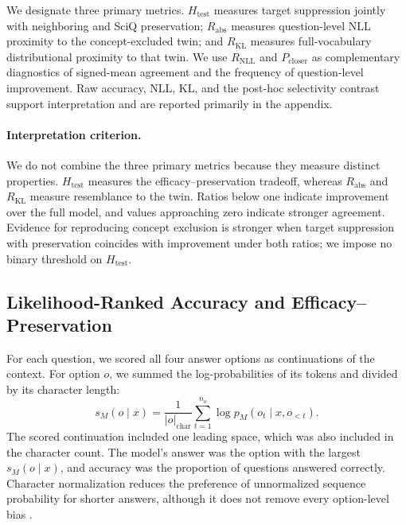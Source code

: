 We designate three primary metrics. $H_{\mathrm{test}}$ measures target
suppression jointly with neighboring and SciQ preservation;
$R_{\mathrm{abs}}$ measures question-level NLL proximity to the
concept-excluded twin; and $R_{\mathrm{KL}}$ measures full-vocabulary
distributional proximity to that twin. We use $R_{\mathrm{NLL}}$ and
$P_{\mathrm{closer}}$ as complementary diagnostics of signed-mean agreement
and the frequency of question-level improvement. Raw accuracy, NLL, KL, and
the post-hoc selectivity contrast support interpretation and are reported
primarily in the appendix.

\paragraph{Interpretation criterion.}
We do not combine the three primary metrics because they measure distinct
properties. $H_{\mathrm{test}}$ measures the efficacy--preservation tradeoff,
whereas $R_{\mathrm{abs}}$ and $R_{\mathrm{KL}}$ measure resemblance to the
twin. Ratios below one indicate improvement over the full model, and values
approaching zero indicate stronger agreement. Evidence for reproducing
concept exclusion is stronger when target suppression with preservation
coincides with improvement under both ratios; we impose no binary threshold
on $H_{\mathrm{test}}$.

\subsection{Likelihood-Ranked Accuracy and Efficacy--Preservation}

For each question, we scored all four answer options as continuations of the
context. For option $o$, we summed the log-probabilities of its tokens and
divided by its character length:
\begin{equation}
s_M(o\mid x)
=
\frac{1}{|o|_{\mathrm{char}}}
\sum_{t=1}^{n_o}
\log p_M(o_t\mid x,o_{<t}).
\end{equation}
The scored continuation included one leading space, which was also included
in the character count. The model's answer was the option with the largest
$s_M(o\mid x)$, and accuracy was the proportion of questions answered
correctly. Character normalization reduces the preference of unnormalized
sequence probability for shorter answers, although it does not remove every
option-level bias \citep{gu2025olmes}.

